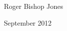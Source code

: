 \vfill

Roger Bishop Jones

September 2012

\mainmatter

\renewcommand{\aref}{Volume \arabic{chapter} Book \Roman{section} Part \arabic{subsection}}
\renewcommand{\RbJsref}{\arabic{chapter}\Roman{section}\arabic{subsection}}



\backmatter

%
%




\renewcommand{\aref}{}
\renewcommand{\RbJsref}{}
\renewcommand{\volumename}{}
\renewcommand{\chaptermark}[1]{}
\renewcommand{\sectionmark}[1]{}

\printindex

\vfil



